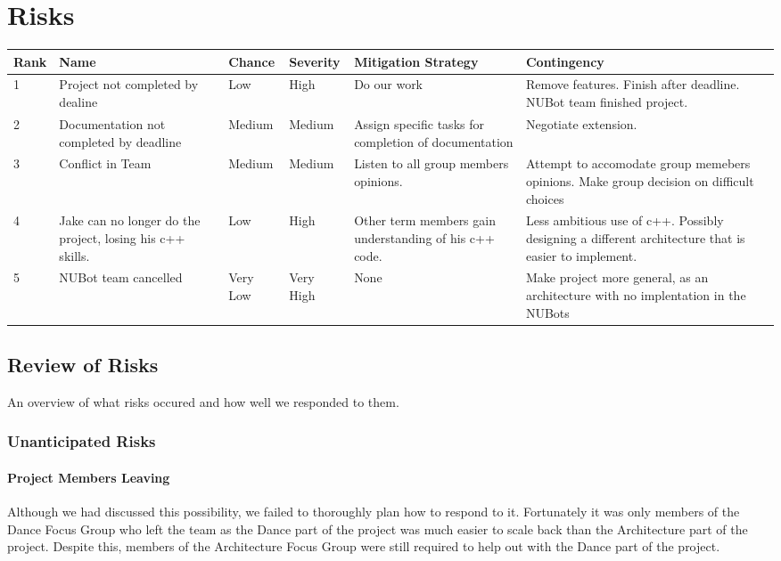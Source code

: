 \documentclass[a4paper]{article}
\begin{document}
	\section{Risks}
		\begin{tabularx}{\linewidth}{l  X  X X  X  X X}
			\hline
			Rank & Name & Chance & Severity & Mitigation Strategy & Contingency \\ \hline
			1 & Project not completed by dealine & Low & High & Do our work & Remove features. Finish after deadline. NUBot team finished project. \\ \hline
			2 & Documentation not completed by deadline & Medium & Medium & Assign specific tasks for completion of documentation & Negotiate extension. \\ \hline
			3 & Conflict in Team & Medium & Medium & Listen to all group members opinions. & Attempt to accomodate group memebers opinions. Make group decision on difficult choices \\ \hline
			4 & Jake can no longer do the project, losing his c++ skills. & Low & High & Other term members gain understanding of his c++ code. & Less ambitious use of c++. Possibly designing a different architecture that is easier to implement. \\ \hline
			5 & NUBot team cancelled & Very Low & Very High & None & Make project more general, as an architecture with no implentation in the NUBots \\ \hline
			\hline
		\end{tabularx}
		\subsection{Review of Risks}
			An overview of what risks occured and how well we responded to them.
			\subsubsection{Unanticipated Risks}
				\paragraph{Project Members Leaving}  
					Although we had discussed this possibility, we failed to thoroughly plan how to respond to it. Fortunately it was only members of the Dance Focus Group who left the team as the Dance part of the project was much easier to scale back than the Architecture part of the project. Despite this, members of the Architecture Focus Group were still required to help out with the Dance part of the project.
\end{document}
